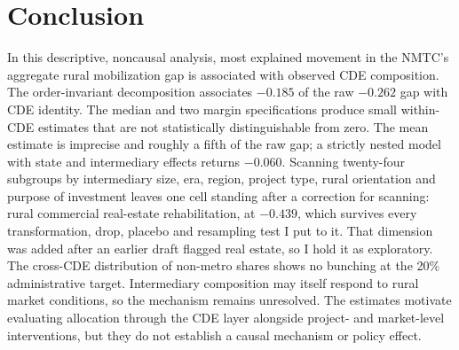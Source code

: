 \section{Conclusion}\label{sec:conclusion}

In this descriptive, noncausal analysis, most explained movement in the
NMTC's aggregate rural mobilization gap is associated with observed CDE
composition. The order-invariant decomposition associates $-0.185$ of the
raw $-0.262$ gap with CDE identity. The median and two margin specifications
produce small within-CDE estimates that are not statistically distinguishable
from zero. The mean estimate is imprecise and roughly a fifth of the raw gap;
a strictly nested model with state and intermediary effects returns
$-0.060$. Scanning twenty-four subgroups by intermediary size, era, region, project
type, rural orientation and purpose of investment leaves one cell standing
after a correction for scanning: rural commercial real-estate
rehabilitation, at $-0.439$, which survives every transformation, drop,
placebo and resampling test I put to it. That dimension was added after an
earlier draft flagged real estate, so I hold it as exploratory. The cross-CDE distribution of non-metro shares
shows no bunching at the 20\% administrative target. Intermediary composition may itself respond to rural market
conditions, so the mechanism remains unresolved. The estimates motivate
evaluating allocation through the CDE layer alongside project- and
market-level interventions, but they do not establish a causal mechanism or
policy effect.
